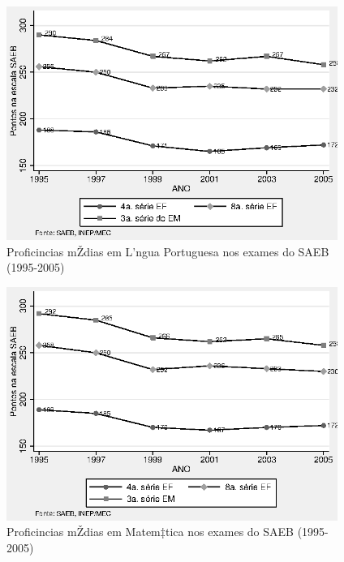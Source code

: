 \documentclass[a4paper, 12pt]{article}
\begin{document}

\begin{figure}[h]
\centering
\begin{footnotesize}
\caption{Proficincias mŽdias em L’ngua Portuguesa  nos exames do 
\newline SAEB (1995-2005)} 
\label{fig:SAEB}                             
 \includegraphics[height=3in]{SAEB}
\end{footnotesize}
\end{figure}
 




\begin{figure}[h]
\centering
\begin{footnotesize}
\caption{Proficincias mŽdias em Matem‡tica nos exames do
\newline SAEB (1995-2005)} 
\label{fig:SAEB2}                             
 \includegraphics[height=3in]{SAEB2}
\end{footnotesize}
\end{figure}
 
\end{document}
